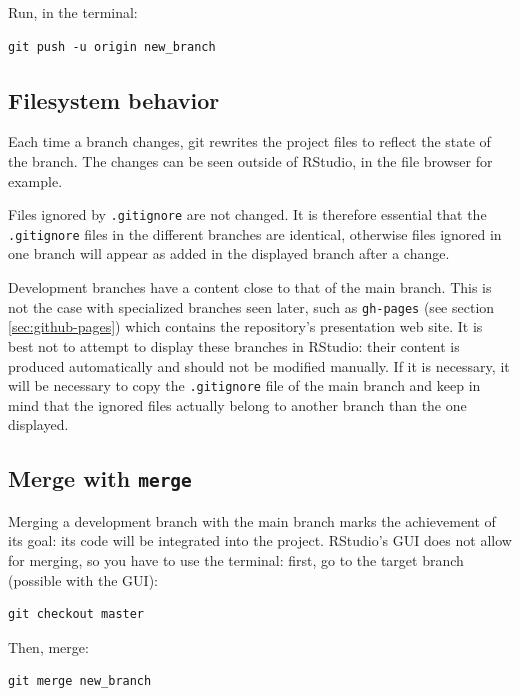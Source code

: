 \documentclass[
  12pt,
  american,
  a4paper,
  extrafontsizes,onecolumn,openright
  ]{memoir}
\begin{document}
Run, in the terminal:

\begin{verbatim}
git push -u origin new_branch
\end{verbatim}

\hypertarget{filesystem-behavior}{%
\subsection{Filesystem behavior}\label{filesystem-behavior}}

Each time a branch changes, git rewrites the project files to reflect the state of the branch.
The changes can be seen outside of RStudio, in the file browser for example.

Files ignored by \texttt{.gitignore} are not changed.
It is therefore essential that the \texttt{.gitignore} files in the different branches are identical, otherwise files ignored in one branch will appear as added in the displayed branch after a change.

Development branches have a content close to that of the main branch.
This is not the case with specialized branches seen later, such as \texttt{gh-pages} (see section \ref{sec:github-pages}) which contains the repository's presentation web site.
It is best not to attempt to display these branches in RStudio: their content is produced automatically and should not be modified manually.
If it is necessary, it will be necessary to copy the \texttt{.gitignore} file of the main branch and keep in mind that the ignored files actually belong to another branch than the one displayed.

\hypertarget{merge-with-merge}{%
\subsection{\texorpdfstring{Merge with \texttt{merge}}{Merge with merge}}\label{merge-with-merge}}

Merging a development branch with the main branch marks the achievement of its goal: its code will be integrated into the project.
RStudio's GUI does not allow for merging, so you have to use the terminal: first, go to the target branch (possible with the GUI):

\begin{verbatim}
git checkout master
\end{verbatim}

Then, merge:

\begin{verbatim}
git merge new_branch
\end{verbatim}
\end{document}

